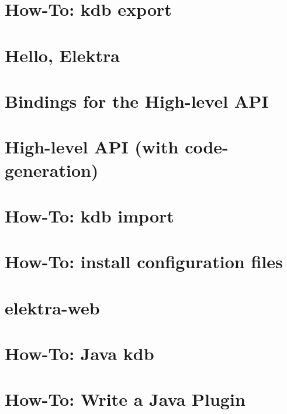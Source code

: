\documentclass[twoside]{book}
\newcommand{\+}{\discretionary{\mbox{\scriptsize$\hookleftarrow$}}{}{}}
\begin{document}
\chapter{How-\/\+To\+: kdb export}
\label{doc_tutorials_export_md}

\chapter{Hello, Elektra}
\label{doc_tutorials_hello-elektra_md}

\chapter{Bindings for the High-\/level A\+PI}
\label{doc_tutorials_highlevel-bindings_md}

\chapter{High-\/level A\+PI (with code-\/generation)}
\label{doc_tutorials_highlevel_md}

\chapter{How-\/\+To\+: kdb import}
\label{doc_tutorials_import_md}

\chapter{How-\/\+To\+: install configuration files}
\label{doc_tutorials_install-config-files_md}

\chapter{elektra-\/web}
\label{doc_tutorials_install-webui_md}

\chapter{How-\/\+To\+: Java kdb}
\label{doc_tutorials_java-kdb_md}

\chapter{How-\/\+To\+: Write a Java Plugin}
\label{doc_tutorials_java-plugins_md}

\end{document}
